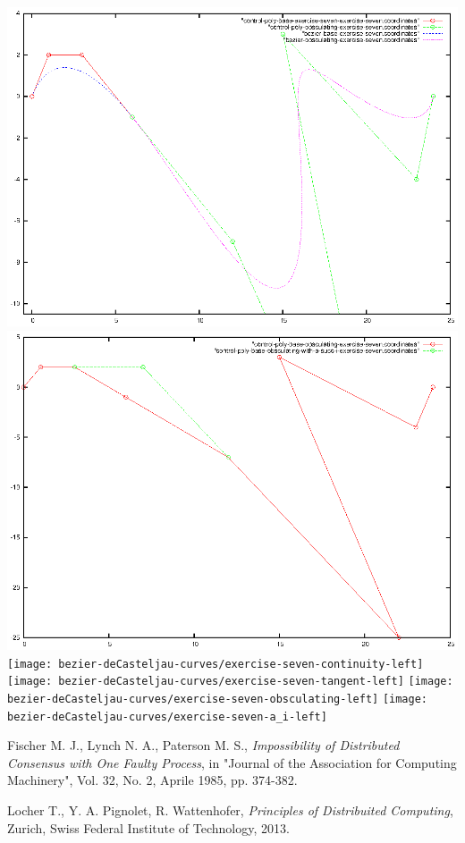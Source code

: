 \documentclass{article}
\begin{document}
\includegraphics{bezier-deCasteljau-curves/exercise-seven-obsculating}
\includegraphics{bezier-deCasteljau-curves/exercise-seven-a_succ_i}
\texttt{[image: bezier-deCasteljau-curves/exercise-seven-continuity-left]}
\texttt{[image: bezier-deCasteljau-curves/exercise-seven-tangent-left]}
\texttt{[image: bezier-deCasteljau-curves/exercise-seven-obsculating-left]}
\texttt{[image: bezier-deCasteljau-curves/exercise-seven-a\_i-left]}

\newpage

\begin{thebibliography}{}

 Fischer M. J., Lynch N. A., Paterson M. S.,
  \emph{Impossibility of Distributed Consensus with One Faulty
    Process}, in "Journal of the Association for Computing Machinery",
  Vol. 32, No. 2, Aprile 1985, pp. 374-382.

 Locher T., Y. A. Pignolet, R. Wattenhofer,
  \textit{Principles of Distribuited Computing}, Zurich, Swiss Federal
  Institute of Technology, 2013.


\end{thebibliography}
\end{document}
